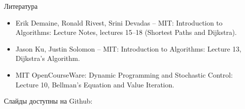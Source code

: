 \documentclass{beamer}
\newcommand{\myqrframe}{
	\begin{frame}
		\begin{center}
			\centerline{Слайды доступны на Github:}
			\bigskip
			\centerline{\mygit}
			\bigskip
			\myqr
		\end{center}
	\end{frame}
}
\begin{document}
	
	
	
	\begin{frame}{Литература}
		\begin{itemize}
			
			\item Erik Demaine, Ronald Rivest, Srini Devadas -- MIT:
			{Introduction to Algorithms: Lecture Notes, lectures 15--18 (Shortest Paths and Dijkstra).}
			
			\item Jason Ku, Justin Solomon -- MIT:
			{Introduction to Algorithms: Lecture 13, Dijkstra's Algorithm.}
			
			\item MIT OpenCourseWare:
			{Dynamic Programming and Stochastic Control: Lecture 10, Bellman's Equation and Value Iteration.}
			
		\end{itemize}
	\end{frame}



\myqrframe
\end{document}
